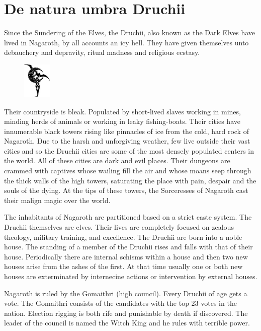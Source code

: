 \documentclass[a4paper]{dnd5}
\begin{document}
\section*{De natura umbra Druchii}

Since the Sundering of the Elves, the Druchii, also known as the Dark Elves have lived in Nagaroth, by all accounts an icy hell.  They have given themselves unto debauchery and depravity, ritual madness and religious ecstasy.  

\begin{figure}%
\begin{center}%
\includegraphics[width=0.12\textwidth,height=0.2\textwidth]{darkelf_logo.jpg}%
\end{center}%
\end{figure}

Their countryside is bleak.  Populated by short-lived slaves working in mines, minding herds of animals or working in leaky fishing-boats.  Their cities have innumerable black towers rising like pinnacles of ice from the cold, hard rock of Nagaroth. Due to the harsh and unforgiving weather, few live outside their vast cities and so the Druchii cities are some of the most densely populated centers in the world.   All of these cities are dark and evil places. Their dungeons are crammed with captives whose wailing fill the air and whose moans seep through the thick walls of the high towers, saturating the place with pain, despair and the souls of the dying. At the tips of these towers, the Sorceresses of Nagaroth cast their malign magic over the world.

The inhabitants of Nagaroth are partitioned based on a strict caste system.  The Druchii themselves are elves.  Their lives are completely focused on zealous theology, military training, and excellence.  The Druchii are born into a noble house.  The standing of a member of the Druchii rises and falls with that of their house.  Periodically there are internal schisms within a house and then two new houses arise from the ashes of the first.  At that time usually one or both new houses are exterminated by internecine actions or intervention by external houses.  

Nagaroth is ruled by the Gomaithri (high council).  Every Druchii of age gets a vote.  The Gomaithri consists of the candidates with the top 23 votes in the nation.  Election rigging is both rife and punishable by death if discovered.  The leader of the council is named the Witch King and he rules with terrible power.
\end{document}
